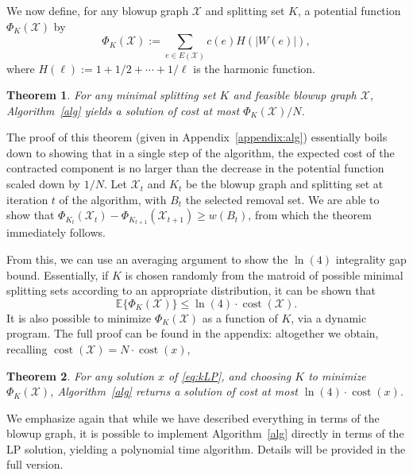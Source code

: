 \documentclass[11pt, letterpaper]{article}
\newtheorem{theorem}{Theorem}[section]
\theoremstyle{definition}
\DeclareMathOperator{\cost}{cost}
\newcommand{\cc}[1]{c(#1)}
\newcommand{\grphx}{\mathcal{X}}
\newcommand{\core}{K}
\newcommand{\harmonic}[1]{H({#1})}
\newcommand{\pot}[2]{\Phi_{#1}(#2)}
\newcommand{\Pot}{\pot{\core}{\grphx}}
\newcommand{\E}[1]{\mathbb{E}\{#1\}}
\newcommand{\witness}[3]{W(#3)}
\newcommand{\Witness}[1]{\witness{\core}{\grphx}{#1}}
\newcommand{\card}[1]{\lvert#1\rvert}
\begin{document}
We now define, for any blowup graph $\grphx$ and splitting set $\core$, a potential function $\pot{\core}{\grphx}$ by
\[ \pot{\core}{\grphx} := \sum_{e \in E(\grphx)} \cc{e}\harmonic{\card{\Witness{e}}}, \]
where $H(\ell) := 1 + 1/2 + \cdots + 1/\ell$ is the harmonic function.
\begin{theorem}\label{thm:potbound}
	For any minimal splitting set $\core$ and feasible blowup graph $\grphx$, Algorithm~\ref{alg} yields a solution of cost at most $\pot{K}{\grphx}/N$.
\end{theorem}
The proof of this theorem (given in Appendix~\ref{appendix:alg}) essentially boils down to showing that in a single step of the algorithm, the expected cost of the contracted component is no larger than the decrease in the potential function scaled down by $1/N$.
Let $\grphx_t$ and $\core_t$ be the blowup graph and splitting set at iteration $t$ of the algorithm, with $B_t$ the selected removal set.
We are able to show that $\pot{\core_t}{\grphx_t} - \pot{\core_{t+1}}{\grphx_{t+1}} \geq w(B_t)$, from which the theorem immediately follows.

From this, we can use an averaging argument to show the $\ln (4)$ integrality gap bound.
Essentially, if $\core$ is chosen randomly from the matroid of possible minimal splitting sets according to an appropriate distribution, it can be shown that 
\[  \E{\pot{K}{\grphx}} \leq \ln (4) \cdot \cost(\grphx). \]
It is also possible to minimize $\Pot$ as a function of $\core$, via a dynamic program. 
The full proof can be found in the appendix: altogether we obtain, recalling $\cost(\grphx) = N\cdot\cost(x)$, 
\begin{theorem}\label{thm:ln4bound}
	For any solution $x$ of \eqref{eq:kLP}, and choosing $\core$ to minimize $\pot{\core}{\grphx}$, Algorithm~\ref{alg} returns a solution of cost at most $\ln(4) \cdot \cost(x)$.
\end{theorem}
We emphasize again that while we have described everything in terms of the blowup graph, it is possible to implement Algorithm~\ref{alg} directly in terms of the LP solution, yielding a polynomial time algorithm. Details will be provided in the full version.
\end{document}
